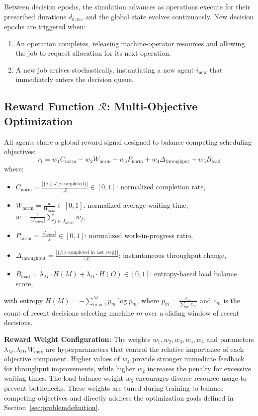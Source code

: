 Between decision epochs, the simulation advances as operations execute for their prescribed durations \( d_{\theta,m} \), and the global state evolves continuously. New decision epochs are triggered when:
\begin{enumerate}
    \item An operation completes, releasing machine-operator resources and allowing the job to request allocation for its next operation.
    \item A new job arrives stochastically, instantiating a new agent \( i_{\text{new}} \) that immediately enters the decision queue.
\end{enumerate}

\subsection{Reward Function $\mathcal{R}$: Multi-Objective Optimization}
All agents share a global reward signal designed to balance competing scheduling objectives:
\begin{equation}
r_t = w_1 C_{\text{norm}} - w_2 W_{\text{norm}} - w_3 P_{\text{norm}} + w_4 \Delta_{\text{throughput}} + w_5 B_{\text{load}}
\end{equation}
where:
\begin{itemize}
    \item \( C_{\text{norm}} = \frac{|\{j \in J : j \text{ completed}\}|}{|J|} \in [0,1] \): normalized completion rate,
    \item \( W_{\text{norm}} = \frac{\bar{w}}{W_{\max}} \in [0,1] \): normalized average waiting time, \( \bar{w} = \frac{1}{|J_{\text{active}}|} \sum_{j \in J_{\text{active}}} w_j \),
    \item \( P_{\text{norm}} = \frac{|J_{\text{active}}|}{|J|} \in [0,1] \): normalized work-in-progress ratio,
    \item \( \Delta_{\text{throughput}} = \frac{|\{j : j \text{ completed in last step}\}|}{|J|} \): instantaneous throughput change,
    \item \( B_{\text{load}} = \lambda_M \cdot H(M) + \lambda_O \cdot H(O) \in [0,1] \): entropy-based load balance score,
\end{itemize}
with entropy \( H(M) = -\sum_{m=1}^M p_m \log p_m \), where \( p_m = \frac{c_m}{\sum_{m'} c_{m'}} \) and \( c_m \) is the count of recent decisions selecting machine \( m \) over a sliding window of recent decisions.

\textbf{Reward Weight Configuration:}
The weights \( w_1, w_2, w_3, w_4, w_5 \) and parameters \( \lambda_M, \lambda_O, W_{\max} \) are hyperparameters that control the relative importance of each objective component. Higher values of \( w_4 \) provide stronger immediate feedback for throughput improvements, while higher \( w_2 \) increases the penalty for excessive waiting times. The load balance weight \( w_5 \) encourages diverse resource usage to prevent bottlenecks. These weights are tuned during training to balance competing objectives and directly address the optimization goals defined in Section~\ref{sec:problemdefinition}.

